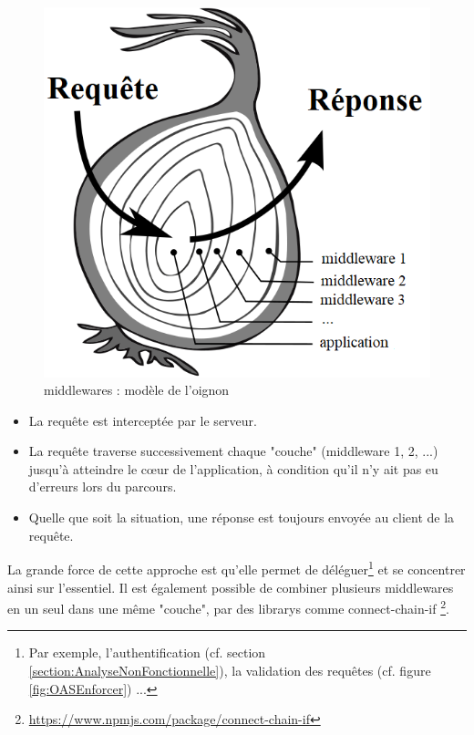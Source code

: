 \begin{figure}[H]
    \includegraphics[width=\textwidth,height=0.25\textheight,keepaspectratio]{images/serveur/middleware_onion.png}
    \centering
    \caption{\Glspl{middleware} : modèle de l'oignon}
    \label{fig:middlewareOnion}
\end{figure}

\begin{itemize}[nosep,noitemsep,topsep=0pt,partopsep=0pt,after=\vspace*{2pt}]
    \item La requête est interceptée par le serveur.
    \item La requête traverse successivement chaque "couche" (\gls{middleware} 1, 2, ...) jusqu'à atteindre le cœur de l'application, 
    à condition qu'il n'y ait pas eu d'erreurs lors du parcours.
    \item Quelle que soit la situation, une réponse est toujours envoyée au client de la requête.
\end{itemize}

La grande force de cette approche est qu'elle permet de déléguer\footnote{
    Par exemple, l'authentification (cf. section \ref{section:AnalyseNonFonctionnelle}), la validation des requêtes (cf. figure \ref{fig:OASEnforcer}) ...
} et se concentrer ainsi sur l'essentiel. Il est également possible de combiner plusieurs \glspl{middleware} en un seul dans une même "couche", par des \glspl{library} comme connect-chain-if
\footnote{
    \url{https://www.npmjs.com/package/connect-chain-if}
}.

